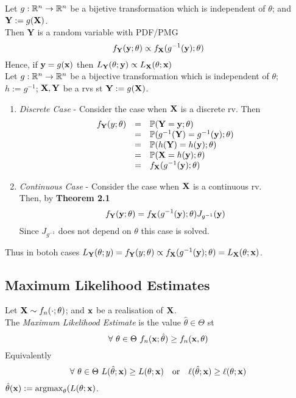 \documentclass[11pt,a4paper]{article}
\begin{document}
Let $g:\mathbb{R}^n\to\mathbb{R}^n$ be a bijetive transformation which is independent of $\theta$; and $\textbf{Y}:=g(\textbf{X})$.\\
Then $\textbf{Y}$ is a random variable with PDF/PMG
$$f_{\textbf{Y}}(\textbf{y};\theta)\propto f_{\textbf{X}}(g^{-1}(\textbf{y});\theta)$$
Hence, if $\textbf{y}=g(\textbf{x})$ then $L_{\textbf{Y}}(\theta;\textbf{y})\propto L_{\textbf{X}}(\theta;\textbf{x})$\\

Let $g:\mathbb{R}^n\to\mathbb{R}^n$ be a bijective transformation which is independent of $\theta$; $h:=g^{-1}$;  $\textbf{X},\textbf{Y}$ be a rvs st $\textbf{Y}:=g(\textbf{X})$.
\begin{enumerate}[label=\roman*)]
	\item \textit{Discrete Case} - Consider the case when $\textbf{X}$ is a discrete rv. Then
	\[\begin{array}{rcl}
	f_\textbf{Y}(y;\theta)&=&\mathbb{P}(\textbf{Y}=\textbf{y};\theta)\\
	&=&\mathbb{P}(g^{-1}(\textbf{Y})=g^{-1}(\textbf{y});\theta)\\
	&=&\mathbb{P}(h(\textbf{Y})=h(\textbf{y});\theta)\\
	&=&\mathbb{P}(\textbf{X}=h(\textbf{y});\theta)\\
	&=&f_{\textbf{X}}(g^{-1}(\textbf{y});\theta)
	\end{array}\]
	\item \textit{Continuous Case} - Consider the case when $\textbf{X}$ is a continuous rv.\\
	Then, by \textbf{Theorem 2.1}
	$$f_\textbf{Y}(\textbf{y};\theta)=f_{\textbf{X}}(g^{-1}(\textbf{y});\theta)J_{g^{-1}}(\textbf{y})$$
	Since $J_{g^{-1}}$ does not depend on $\theta$ this case is solved.
\end{enumerate}
Thus in botoh cases $L_\textbf{Y}(\theta;y)=f_\textbf{Y}(y;\theta)\propto f_{\textbf{X}}(g^{-1}(\textbf{y});\theta)=L_{\textbf{X}}(\theta;\textbf{x})$.
\proved

\subsection{Maximum Likelihood Estimates}

Let $\textbf{X}\sim f_n(\cdot;\theta)$; and $\textbf{x}$ be a realisation of $\textbf{X}$.\\
The \textit{Maximum Likelihood Estimate} is the value $\hat{\theta}\in\Theta$ st
$$\forall\ \theta\in\Theta\ f_n(\x;\hat{\theta})\geq f_n(\x,\theta)$$
Equivalently
$$\forall\ \theta\in\Theta\ L(\hat{\theta};\textbf{x})\geq L(\theta;\textbf{x})\quad\mathrm{or}\quad\ell(\hat{\theta};\textbf{x})\geq\ell(\theta;\textbf{x})$$
\ie $\hat{\theta}(\textbf{x}):=\mathrm{argmax}_\theta(L(\theta;\textbf{x})$.\\
\end{document}
